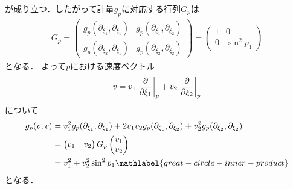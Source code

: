 \documentclass{ltjsarticle}
\begin{document}
が成り立つ．したがって計量\(g_p\)に対応する行列\(G_p\)は
\begin{align*}
    G_p =
    \begin{pmatrix}
        g_p(\partial_{\xi_1}, \partial_{\xi_1}) & g_p(\partial_{\xi_1}, \partial_{\xi_2}) \\
        g_p(\partial_{\xi_2}, \partial_{\xi_1}) & g_p(\partial_{\xi_2}, \partial_{\xi_2})
    \end{pmatrix}
    =
    \begin{pmatrix}
        1 & 0 \\
        0 & \sin^2 p_1
    \end{pmatrix}
\end{align*}
となる．
よって\(p\)における速度ベクトル
\begin{align*}
    v = v_1 \left.\frac{\partial}{\partial \xi_1}\right\lvert_{p} + v_2 \left.\frac{\partial}{\partial \xi_2}\right\lvert_{p}
\end{align*}
について
\begin{align}
    g_p(v, v)
    &= v_1^2 g_p(\partial_{\xi_1}, \partial_{\xi_1}) + 2 v_1 v_2 g_p(\partial_{\xi_1}, \partial_{\xi_2}) + v_2^2 g_p(\partial_{\xi_2}, \partial_{\xi_2}) \notag \\
    &= \begin{pmatrix} v_1 & v_2 \end{pmatrix} G_p \begin{pmatrix} v_1 \\ v_2 \end{pmatrix} \notag \\
    &= v_1^2 + v_2^2 \sin^2 p_1 \mathlabel{great-circle-inner-product}
\end{align}
となる．
\end{document}
